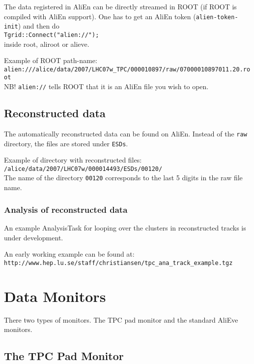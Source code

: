 \documentclass[a4paper,12pt]{article}
\begin{document}
The data registered in AliEn can be directly streamed in ROOT (if ROOT
is compiled with AliEn support).  One has to get an AliEn token
(\texttt{alien-token-init}) and then do\\
\texttt{Tgrid::Connect("alien://");}\\
inside root, aliroot or alieve.

Example of ROOT path-name:\\
\texttt{alien:///alice/data/2007/LHC07w\_TPC/000010897/raw/07000010897011.20.root}\\
NB! \texttt{alien://} tells ROOT that it is an AliEn file you wish to
open.

\subsection{Reconstructed data}

The automatically reconstructed data can be found on AliEn. Instead of the \texttt{raw} directory, the files are stored under \texttt{ESDs}.

Example of directory with reconstructed files:\\
\texttt{/alice/data/2007/LHC07w/000014493/ESDs/00120/}\\ 
The name of the directory \texttt{00120} corresponds to the last 5
digits in the raw file name.

\subsubsection{Analysis of reconstructed data}

An example AnalysisTask for looping over the clusters in reconstructed
tracks is under development.

An early working example can be found at:\\
\texttt{http://www.hep.lu.se/staff/christiansen/tpc\_ana\_track\_example.tgz}

\newpage 

\section{Data Monitors}

There two types of monitors. The TPC pad monitor and the standard
AliEve monitors.

\subsection{The TPC Pad Monitor}
\end{document}
